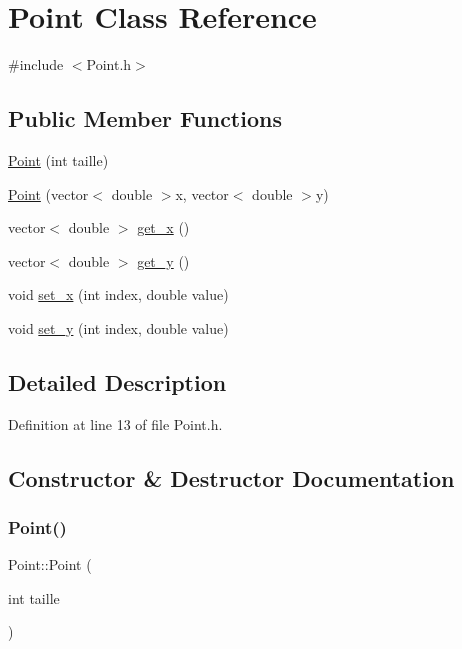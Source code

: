 \hypertarget{class_point}{}\section{Point Class Reference}
\label{class_point}


{\ttfamily \#include $<$Point.\+h$>$}

\subsection*{Public Member Functions}
\begin{DoxyCompactItemize}
\item 
\mbox{\hyperlink{class_point_acfded4fb511fce4b9c7f4704a310d628}{Point}} (int taille)
\item 
\mbox{\hyperlink{class_point_ac5bfcc2d69bc85e707d6a656bce77bfe}{Point}} (vector$<$ double $>$x, vector$<$ double $>$y)
\item 
vector$<$ double $>$ \mbox{\hyperlink{class_point_a39670bab179c132637bad3ccedbd2a73}{get\+\_\+x}} ()
\item 
vector$<$ double $>$ \mbox{\hyperlink{class_point_a93aa3493de3e14400ae635f4780fb29f}{get\+\_\+y}} ()
\item 
void \mbox{\hyperlink{class_point_a0e06062c8608e039f214cd0815634aa2}{set\+\_\+x}} (int index, double value)
\item 
void \mbox{\hyperlink{class_point_a140e7315cdb4c66f1230df7e7b92ffa5}{set\+\_\+y}} (int index, double value)
\end{DoxyCompactItemize}


\subsection{Detailed Description}


Definition at line 13 of file Point.\+h.



\subsection{Constructor \& Destructor Documentation}
\mbox{\label{class_point_acfded4fb511fce4b9c7f4704a310d628}} 
\subsubsection{\texorpdfstring{Point()}{Point()}\hspace{0.1cm}{\footnotesize\ttfamily [1/2]}}
{\footnotesize\ttfamily Point\+::\+Point (\begin{DoxyParamCaption}\item[{int}]{taille }\end{DoxyParamCaption})}



